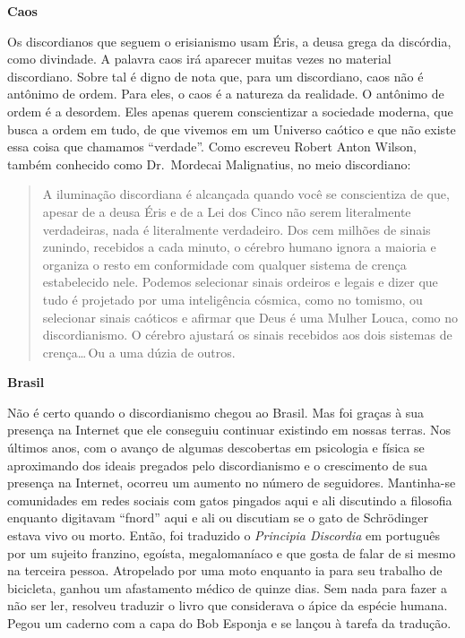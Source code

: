 \newpage
\begin{flushleft}
{\Large \textbf{Caos}}
\end{flushleft}

Os discordianos que seguem o erisianismo usam Éris, a deusa grega da discórdia, como divindade. A palavra caos irá aparecer muitas vezes no material discordiano. Sobre tal é dig\-no de nota que, para um discordiano, caos não é antônimo de ordem. Para eles, o caos é a natureza da realidade. O antônimo de ordem é a desordem. Eles apenas querem conscientizar a sociedade moderna, que busca a ordem em tudo, de que vivemos em um Universo caótico e que não existe essa coisa que chamamos ``verdade''. Como escreveu Robert Anton Wilson, também conhecido como Dr.~Mordecai Malignatius, no meio discordiano:

	\begin{quote}
	{\small
	A iluminação discordiana é alcançada quando você se conscientiza de que, apesar de a deusa Éris e de a Lei dos Cinco não serem literalmente verdadeiras, nada é literalmente verdadeiro. Dos cem milhões de sinais zunindo, recebidos a cada minuto, o cérebro humano ignora a maioria e organiza o resto em conformidade com qualquer sistema de crença estabelecido nele. Podemos selecionar sinais ordeiros e legais e dizer que tudo é projetado por uma inteligência cósmica, como no tomismo, ou selecionar sinais caóticos e afirmar que Deus é uma Mulher Louca, como no discordianismo. O cérebro ajustará os sinais recebidos aos dois sistemas de crença\ldots\,Ou a uma dúzia de outros.}
	\end{quote}
 
\begin{flushleft}
{\Large \textbf{Brasil}}
\end{flushleft}

Não é certo quando o discordianismo chegou ao Brasil. Mas foi graças à sua presença na Internet que ele conseguiu continuar existindo em nossas terras. Nos últimos anos, com o avanço de algumas descobertas em psicologia e física se aproximando dos ideais pregados pelo discordianismo e o crescimento de sua presença na Internet, ocorreu um aumento no número de seguidores.  Mantinha-se comunidades em redes sociais com gatos pingados aqui e ali discutindo a filosofia enquanto digitavam ``fnord'' aqui e ali ou discutiam se o gato de Schrödinger estava vivo ou morto. Então, foi traduzido o \emph{Principia Discordia} em português por um sujeito franzino, egoísta, megalomaníaco e que gosta de falar de si mesmo na terceira pessoa. Atropelado por uma moto enquanto ia para seu trabalho de bicicleta, ganhou um afastamento médico de quinze dias. Sem nada para fazer a não ser ler, resolveu traduzir o livro que considerava o ápice da espécie humana. Pegou um caderno com a capa do Bob Esponja e se lançou à tarefa da tradução.

